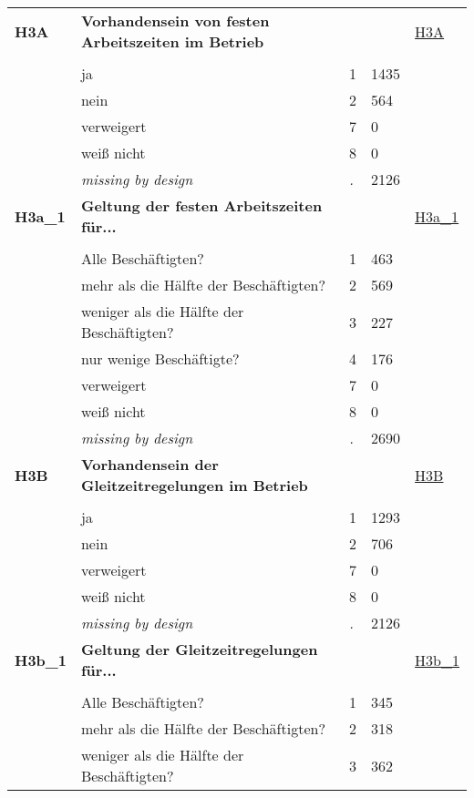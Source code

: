 \begin{longtable}{| L{2.65cm} | L{8cm} | C{1.5cm} | R{1.25cm} | C{2.25cm}  |}
   \midrule
\textbf{H3A}\label{var:H3A} & \textbf{Vorhandensein von festen Arbeitszeiten im Betrieb} &  &  & \hyperref[H3A]{H3A} \\ 
   &  &  &  &  \\ 
   & ja & 1 & 1435 &  \\ 
   & nein & 2 & 564 &  \\ 
   & verweigert & 7 & 0 &  \\ 
   & weiß nicht & 8 & 0 &  \\ 
   & \textit{missing by design} & \textit{.} & 2126 &  \\ 
   \midrule
\textbf{H3a\_1}\label{var:H3a:1} & \textbf{Geltung der festen Arbeitszeiten für...} &  &  & \hyperref[H3a:1]{H3a\_1} \\ 
   &  &  &  &  \\ 
   & Alle Beschäftigten? & 1 & 463 &  \\ 
   & mehr als die Hälfte der Beschäftigten? & 2 & 569 &  \\ 
   & weniger als die Hälfte der Beschäftigten? & 3 & 227 &  \\ 
   & nur wenige Beschäftigte? & 4 & 176 &  \\ 
   & verweigert & 7 & 0 &  \\ 
   & weiß nicht & 8 & 0 &  \\ 
   & \textit{missing by design} & \textit{.} & 2690 &  \\ 
   \midrule
\textbf{H3B}\label{var:H3B} & \textbf{Vorhandensein der Gleitzeitregelungen im Betrieb} &  &  & \hyperref[H3B]{H3B} \\ 
   &  &  &  &  \\ 
   & ja & 1 & 1293 &  \\ 
   & nein & 2 & 706 &  \\ 
   & verweigert & 7 & 0 &  \\ 
   & weiß nicht & 8 & 0 &  \\ 
   & \textit{missing by design} & \textit{.} & 2126 &  \\ 
   \midrule
\textbf{H3b\_1}\label{var:H3b:1} & \textbf{Geltung der Gleitzeitregelungen für...} &  &  & \hyperref[H3b:1]{H3b\_1} \\ 
   &  &  &  &  \\ 
   & Alle Beschäftigten? & 1 & 345 &  \\ 
   & mehr als die Hälfte der Beschäftigten? & 2 & 318 &  \\ 
   & weniger als die Hälfte der Beschäftigten? & 3 & 362 &  \\ 

\end{longtable}
